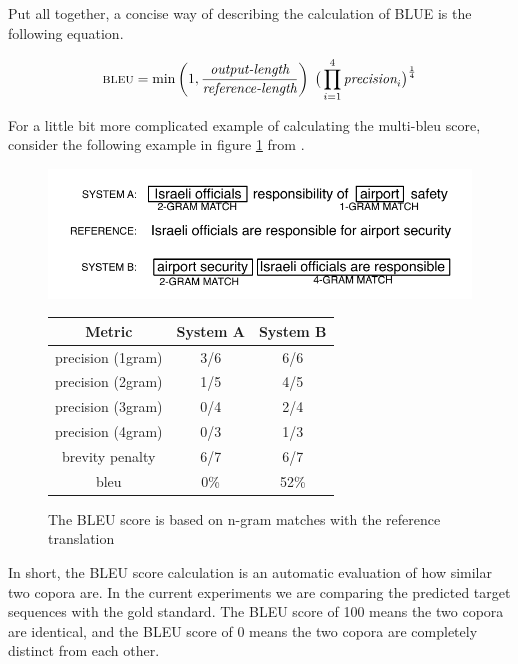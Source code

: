 \documentclass[final]{ua-thesis}
\newcommand{\maths}[1]{\textcolor{purple}{#1}}
\numberwithin{equation}{section}
\begin{document}
Put all together, a concise way of describing the calculation of BLUE is the following equation.  

\maths{\begin{equation} 
\text{\sc bleu} = \min \left( 1,\frac{\text{\em output-length}}{\text{\em reference-length}} \right) \; \big( \prod_{i=1}^4 \text{\em precision}_i \big)^\frac{1}{4}
\end{equation}}

For a little bit more complicated example of calculating the multi-bleu score, consider the following example in figure \ref{bleu_koeh} from \citet[p. 226-227]{koehn2009statistical}.

\begin{figure}[t] \label{bleu_koeh}
\caption{The BLEU score is based on n-gram matches with the reference translation \citep[p. 226-227]{koehn2009statistical}} \label{bleu_koeh}
\begin{center}
\includegraphics[scale=1.5]{bleu-example.pdf}
\begin{tabular}{c|c|c}
{\bf Metric} & \bf System A & \bf System B \\ \hline
precision (1gram) & 3/6 & 6/6 \\ \hline
precision (2gram) & 1/5 & 4/5 \\ \hline
precision (3gram) & 0/4 & 2/4 \\ \hline
precision (4gram) & 0/3 & 1/3  \\ \hline
brevity penalty   & 6/7 & 6/7  \\ \hline 
{\sc bleu} &  0\% & 52\%  \\ \hline
\end{tabular}
\end{center}
\end{figure}


In short, the BLEU score calculation is an automatic evaluation of how similar two copora are. In the current experiments we are comparing the predicted target sequences with the gold standard. The BLEU score of 100 means the two copora are identical, and the BLEU score of 0 means the two copora are completely distinct from each other.
\end{document}
